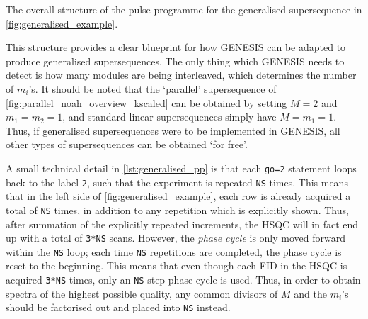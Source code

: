 \begin{mylisting}[!htbp] %
    \caption[Structure of pulse programme for generalised supersequences]{
        The overall structure of the pulse programme for the generalised supersequence in \cref{fig:generalised_example}.
    }
    \label{lst:generalised_pp}
\end{mylisting} %

This structure provides a clear blueprint for how GENESIS can be adapted to produce generalised supersequences.
The only thing which GENESIS needs to detect is how many modules are being interleaved, which determines the number of $m_i$'s.
It should be noted that the `parallel' supersequence of \cref{fig:parallel_noah_overview_kscaled} can be obtained by setting $M = 2$ and $m_1 = m_2 = 1$, and standard linear supersequences simply have $M = m_1 = 1$.
Thus, if generalised supersequences were to be implemented in GENESIS, all other types of supersequences can be obtained `for free'.

A small technical detail in \cref{lst:generalised_pp} is that each \texttt{go=2} statement loops back to the label \texttt{2}, such that the experiment is repeated \texttt{NS} times.
This means that in the left side of \cref{fig:generalised_example}, each row is already acquired a total of \texttt{NS} times, in addition to any repetition which is explicitly shown.
Thus, after summation of the explicitly repeated increments, the HSQC will in fact end up with a total of \texttt{3*NS} scans.
However, the \textit{phase cycle} is only moved forward within the \texttt{NS} loop; each time \texttt{NS} repetitions are completed, the phase cycle is reset to the beginning.
This means that even though each FID in the HSQC is acquired \texttt{3*NS} times, only an \texttt{NS}-step phase cycle is used.
Thus, in order to obtain spectra of the highest possible quality, any common divisors of $M$ and the $m_i$'s should be factorised out and placed into \texttt{NS} instead.


